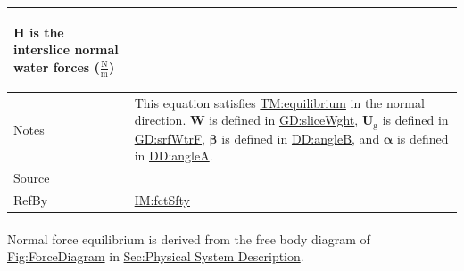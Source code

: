 \documentclass[12pt]{article}
\begin{document}
\begin{minipage}{\textwidth}
\begin{tabular}{>{\raggedright}p{}>{\raggedright\arraybackslash}p{}}
\begin{symbDescription}
              \item{$\symbf{H}$ is the interslice normal water forces ($\frac{\text{N}}{\text{m}}$)}
              \end{symbDescription}
\\ \midrule
Notes & This equation satisfies \hyperref[TM:equilibrium]{TM:equilibrium} in the normal direction. $\symbf{W}$ is defined in \hyperref[GD:sliceWght]{GD:sliceWght}, ${\symbf{U}_{\text{g}}}$ is defined in \hyperref[GD:srfWtrF]{GD:srfWtrF}, $\symbf{β}$ is defined in \hyperref[DD:angleB]{DD:angleB}, and $\symbf{α}$ is defined in \hyperref[DD:angleA]{DD:angleA}.
        
\\ \midrule
Source & \cite{chen2005}
         
\\ \midrule
RefBy & \hyperref[IM:fctSfty]{IM:fctSfty}
        
\\ \bottomrule
\end{tabular}
\end{minipage}

\paragraph{}
\label{GD:normForcEqDeriv}
Normal force equilibrium is derived from the free body diagram of \hyperref[Figure:ForceDiagram]{Fig:ForceDiagram} in \hyperref[Sec:PhysSyst]{Sec:Physical System Description}.
\end{document}
